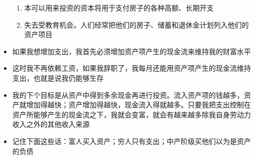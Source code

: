 \documentclass[UTF8,a4paper,8pt]{ctexart}
\begin{document}
\begin{itemize}
\begin{enumerate}
 		\item 本可以用来投资的资本将用于支付房子的各种高额、长期开支
 		\item 失去受教育机会。人们经常把他们的房子、储蓄和退休金计划列入他们的资产项目
 	\end{enumerate}
 	\item 如果我想增加支出，我首先必须增加资产项产生的现金流来维持我的财富水平
 	\item 这时我不再依赖工资，如果我辞职了，我每月还能用资产项产生的现金流维持支出，也就是说我仍能够生存
 	\item 我的下个目标是从资产中得到多余现金再进行投资。流入资产项的钱越多，资产就增加得越快；资产增加得越快，现金流入得就越多。只要我把支出控制在资产所能够产生的现金流之下，我就会变富，就会有越来越多除我自身劳动力收入之外的其他收入来源
 	
 	\item 记住下面这些话：富人买入资产；穷人只有支出；中产阶级买他们以为是资产的负债
 	

\end{itemize}
\end{document}
